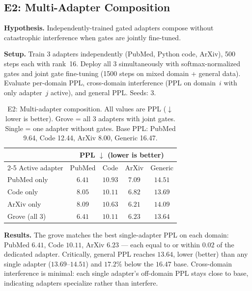 \documentclass{article}
\begin{document}
\subsection{E2: Multi-Adapter Composition}
\label{sec:e2}

\textbf{Hypothesis.} Independently-trained gated adapters compose
without catastrophic interference when gates are jointly fine-tuned.

\textbf{Setup.} Train 3 adapters independently (PubMed, Python code,
ArXiv), 500 steps each with rank~16. Deploy all 3 simultaneously with
softmax-normalized gates and joint gate fine-tuning (1500 steps on
mixed domain + general data). Evaluate per-domain PPL, cross-domain
interference (PPL on domain~$i$ with only adapter~$j$ active), and
general PPL. Seeds: 3.


\begin{table}[h]
\centering
\caption{E2: Multi-adapter composition. All values are PPL
($\downarrow$ lower is better). Grove = all 3 adapters with joint
gates. Single = one adapter without gates. Base PPL: PubMed 9.64,
Code 12.44, ArXiv 8.00, Generic 16.47.}
\label{tab:e2}
\begin{tabular}{@{}lcccc@{}}
\toprule
& \multicolumn{4}{c}{PPL $\downarrow$ (lower is better)} \\
\cmidrule(lr){2-5}
Active adapter & PubMed & Code & ArXiv & Generic \\
\midrule
PubMed only & $6.41$ & $10.93$ & $7.09$ & $14.51$ \\
Code only   & $8.05$ & $10.11$ & $6.82$ & $13.69$ \\
ArXiv only  & $8.09$ & $10.63$ & $6.21$ & $14.09$ \\
\midrule
Grove (all 3) & $\mathbf{6.41}$ & $\mathbf{10.11}$ & $\mathbf{6.23}$ & $\mathbf{13.64}$ \\
\bottomrule
\end{tabular}
\end{table}

\textbf{Results.} The grove matches the best single-adapter PPL on
each domain: PubMed $6.41$, Code $10.11$, ArXiv $6.23$ --- each
equal to or within $0.02$ of the dedicated adapter.  Critically,
general PPL reaches $13.64$, lower (better) than any single adapter
($13.69$--$14.51$) and $17.2\%$ below the $16.47$ base.  Cross-domain
interference is minimal: each single adapter's off-domain PPL stays
close to base, indicating adapters specialize rather than interfere.
\end{document}
